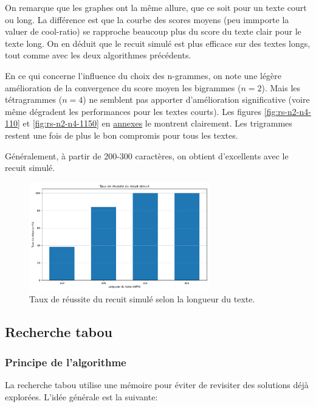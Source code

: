 \documentclass[a4paper]{article}
\begin{document}
On remarque que les graphes ont la même allure, que ce soit pour un texte court ou long. La différence est que la courbe des scores moyens (peu immporte la valuer de cool-ratio) se rapproche beaucoup plus du score du texte clair pour le texte long.
On en déduit que le recuit simulé est plus efficace sur des textes longs, tout comme avec les deux algorithmes précédents.


En ce qui concerne l'influence du choix des n-grammes, on note une légère amélioration de la convergence du score moyen les bigrammes ($n=2$). Mais les tétragrammes ($n=4$) ne semblent pas apporter d'amélioration significative (voire même dégradent les performances pour les textes courts). 
Les figures \ref{fig:rs-n2-n4-110} et \ref{fig:rs-n2-n4-1150} en \hyperref[sec:annexes]{annexes} le montrent clairement. Les trigrammes restent une fois de plus le bon compromis pour tous les textes.

Généralement, à  partir de 200-300 caractères, on obtient d'excellents avec le recuit simulé.

\begin{figure}[H]
    \centering
    \includegraphics[width=0.7\textwidth, keepaspectratio, height=0.6 \textheight]{taux_reussite_rs.png}
    \caption{Taux de réussite du recuit simulé selon la longueur du texte.}
    \label{fig:taux_reussite_rs}
\end{figure}


\subsection{Recherche tabou}
\subsubsection{Principe de l’algorithme}
La recherche tabou utilise une mémoire pour éviter de revisiter des solutions déjà explorées. L'idée générale est la suivante:
\end{document}

